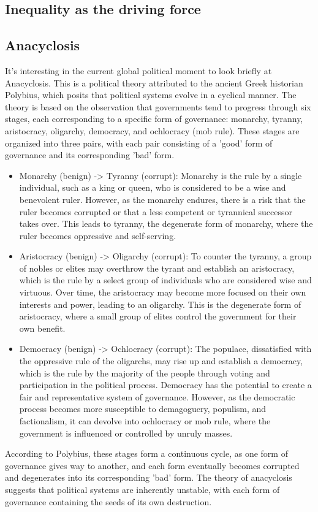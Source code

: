 \subsection{Inequality as the driving force}

\subsection{Anacyclosis}
It's interesting in the current global political moment to look briefly at Anacyclosis. This is a political theory attributed to the ancient Greek historian Polybius, which posits that political systems evolve in a cyclical manner. The theory is based on the observation that governments tend to progress through six stages, each corresponding to a specific form of governance: monarchy, tyranny, aristocracy, oligarchy, democracy, and ochlocracy (mob rule). These stages are organized into three pairs, with each pair consisting of a 'good' form of governance and its corresponding 'bad' form.\par
\begin{itemize}
\item Monarchy (benign) -> Tyranny (corrupt): Monarchy is the rule by a single individual, such as a king or queen, who is considered to be a wise and benevolent ruler. However, as the monarchy endures, there is a risk that the ruler becomes corrupted or that a less competent or tyrannical successor takes over. This leads to tyranny, the degenerate form of monarchy, where the ruler becomes oppressive and self-serving.
\item Aristocracy (benign) -> Oligarchy (corrupt): To counter the tyranny, a group of nobles or elites may overthrow the tyrant and establish an aristocracy, which is the rule by a select group of individuals who are considered wise and virtuous. Over time, the aristocracy may become more focused on their own interests and power, leading to an oligarchy. This is the degenerate form of aristocracy, where a small group of elites control the government for their own benefit.
\item Democracy (benign) -> Ochlocracy (corrupt): The populace, dissatisfied with the oppressive rule of the oligarchs, may rise up and establish a democracy, which is the rule by the majority of the people through voting and participation in the political process. Democracy has the potential to create a fair and representative system of governance. However, as the democratic process becomes more susceptible to demagoguery, populism, and factionalism, it can devolve into ochlocracy or mob rule, where the government is influenced or controlled by unruly masses.
\end{itemize}
According to Polybius, these stages form a continuous cycle, as one form of governance gives way to another, and each form eventually becomes corrupted and degenerates into its corresponding 'bad' form. The theory of anacyclosis suggests that political systems are inherently unstable, with each form of governance containing the seeds of its own destruction. 
